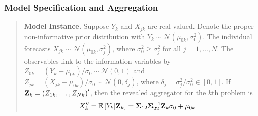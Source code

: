 \documentclass[11pt]{article}
\newcommand{\E}{\mathbb{E}}
\theoremstyle{definition}
\theoremstyle{definition}
\def\Z{{\bf Z}}
\def\E{{\mathbb E}}
\begin{document}
\subsubsection{Model Specification and Aggregation}
\begin{quote}
\textbf{Model Instance.} Suppose $Y_k$ and $X_{jk}$ are real-valued. Denote the proper non-informative prior distribution with $Y_k \sim \mathcal{N}(\mu_{0k}, \sigma_0^2)$. The individual forecasts $X_{jk} \sim \mathcal{N}(\mu_{0k}, \sigma_j^2)$, where $\sigma_0^2 \geq \sigma_j^2$ for all $j = 1, \dots, N$. 
  The observables link to the information variables by $Z_{0k} = (Y_k - \mu_{0k})/\sigma_0 \sim \mathcal{N}(0,1)$ and $Z_{jk} = \left(X_{jk} - \mu_{0k}\right)/\sigma_0 \sim \mathcal{N}(0, \delta_j)$, where $\delta_j = \sigma_j^2/\sigma_0^2 \in [0,1]$. If $\Z_k = \left(Z_{1k}, \dots, Z_{Nk}\right)'$, then the revealed aggregator for the $k$th problem is
\begin{align}
X_k'' =  \E\left[Y_k | \Z_k\right] &= {\bf\Sigma}_{12} {\bf\Sigma}_{22}^{-1} \Z_k \sigma_0 + \mu_{0k} \label{revPoint}
\end{align}
\end{quote}
\end{document}
